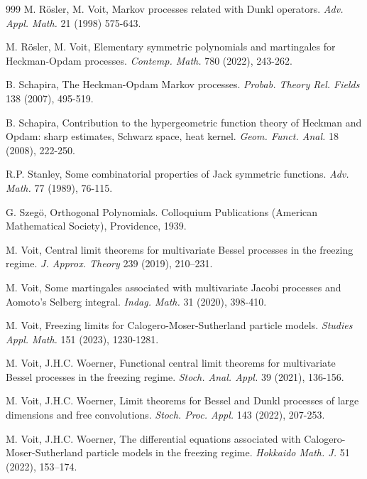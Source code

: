 \documentclass[reqno]{amsart}
\theoremstyle{plain}
\theoremstyle{definition}
\numberwithin{equation}{section}
\begin{document}
\begin{thebibliography}{999}
 M. R\"osler, M. Voit, Markov processes related with Dunkl operators.
  \textit{Adv. Appl. Math.}  21 (1998) 575-643.

   M. R\"osler, M. Voit, Elementary symmetric polynomials and martingales for Heckman-Opdam processes.
\textit{ Contemp. Math.} 780 (2022), 243-262.


 B. Schapira,
The Heckman-Opdam Markov processes.
 \textit{Probab. Theory Rel. Fields} 138 (2007), 
 495-519.

 B. Schapira, Contribution to the hypergeometric function theory of Heckman and Opdam: 
  sharp estimates, Schwarz space, heat kernel.  \textit{Geom. Funct. Anal.} 18 (2008), 222-250.


 R.P. Stanley, Some combinatorial properties 
  of Jack symmetric functions. \textit{Adv. Math.} 77 (1989), 76-115.
  

 

 G. Szeg{\"o}, Orthogonal Polynomials. 
Colloquium Publications (American Mathematical Society), Providence, 1939.


 M. Voit, Central limit theorems 
  for multivariate Bessel processes in the freezing regime.\textit{ J. Approx. Theory } 239 (2019), 210--231.

    M. Voit, Some martingales associated with multivariate Jacobi processes and Aomoto's Selberg integral.
     \textit{Indag. Math.} 31 (2020),  398-410.

    M. Voit,   Freezing limits for  Calogero-Moser-Sutherland  particle models.  \textit{Studies Appl. Math.} 151 (2023),
 1230-1281.


     
  M. Voit, J.H.C. Woerner, Functional 
 central limit theorems for multivariate Bessel processes in the
 freezing regime. \textit{ Stoch. Anal. Appl.} 39 (2021), 136-156. 

 M. Voit, J.H.C. Woerner,  Limit theorems for Bessel and Dunkl processes of large dimensions and free convolutions.
  \textit{Stoch. Proc. Appl.} 143 (2022), 207-253.

  M. Voit, J.H.C. Woerner, The differential equations associated with Calogero-Moser-Sutherland
  particle models in the freezing regime. \textit{Hokkaido Math. J.} 51 (2022), 153--174.


\end{thebibliography}
\end{document}
